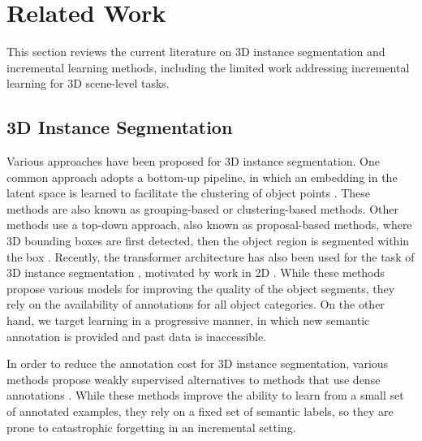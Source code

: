 \section{Related Work}
\label{sec:related_work}
This section reviews the current literature on 3D instance segmentation and incremental learning methods, including the limited work addressing incremental learning for 3D scene-level tasks.

\subsection{3D Instance Segmentation}
Various approaches have been proposed for 3D instance segmentation. One common approach adopts a bottom-up pipeline, in which an embedding in the latent space is learned to facilitate the clustering of object points \cite{wang2018sgpn,lahoud20193d,jiang2020pointgroup,zhang2021point,chen2021hierarchical,han2020occuseg,he2021dyco3d,liang2021instance}. 
These methods are also known as grouping-based or clustering-based methods.
Other methods use a top-down approach, also known as proposal-based methods, where 3D bounding boxes are first detected, then the object region is segmented within the box \cite{yang2019learning, hou20193dsis,liu2020learning,yi2019gspn,engelmann20203d}.
Recently, the transformer architecture \cite{vaswani2017attention} has also been used for the task of 3D instance segmentation \cite{Schult23ICRA,sun2022superpoint}, motivated by work in 2D \cite{cheng2022masked,cheng2021per}. 
While these methods propose various models for improving the quality of the object segments, they rely on the availability of annotations for all object categories. On the other hand, we target learning in a progressive manner, in which new semantic annotation is provided and past data is inaccessible.
 
In order to reduce the annotation cost for 3D instance segmentation, various methods propose weakly supervised alternatives to methods that use dense annotations \cite{xie2020pointcontrast, hou2021exploring,chibane2022box2mask}.
While these methods improve the ability to learn from a small set of annotated examples, they rely on a fixed set of semantic labels, so they are prone to catastrophic forgetting in an incremental setting.

